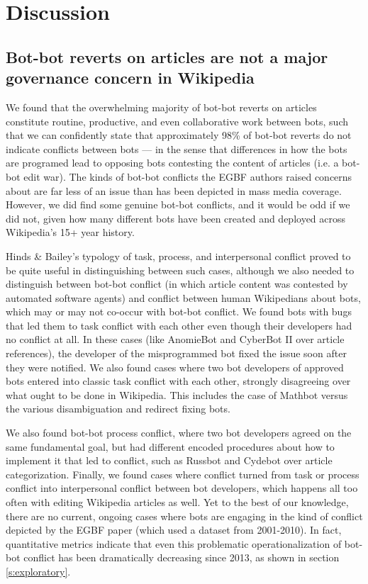 \documentclass[format=acmsmall, review=false, screen=true]{acmart}%
\begin{document}
\section{Discussion}

\subsection{Bot-bot reverts on articles are not a major governance concern in Wikipedia}  
We found that the overwhelming majority of bot-bot reverts on articles constitute routine, productive, and even collaborative work between bots, such that we can confidently state that approximately 98\% of bot-bot reverts do not indicate conflicts between bots --- in the sense that differences in how the bots are programed lead to opposing bots contesting the content of articles (i.e. a bot-bot edit war). The kinds of bot-bot conflicts the EGBF authors raised concerns about are far less of an issue than has been depicted in mass media coverage. However, we did find some genuine bot-bot conflicts, and it would be odd if we did not, given how many different bots have been created and deployed across Wikipedia's 15+ year history. 

Hinds \& Bailey's typology of task, process, and interpersonal conflict \cite{Hinds2003} proved to be quite useful in distinguishing between such cases, although we also needed to distinguish between bot-bot conflict (in which article content was contested by automated software agents) and conflict between human Wikipedians about bots, which may or may not co-occur with bot-bot conflict. We found bots with bugs that led them to task conflict with each other even though their developers had no conflict at all. In these cases (like AnomieBot and CyberBot II over article references), the developer of the misprogrammed bot fixed the issue soon after they were notified. We also found cases where two bot developers of approved bots entered into classic task conflict with each other, strongly disagreeing over what ought to be done in Wikipedia. This includes the case of Mathbot versus the various disambiguation and redirect fixing bots.

We also found bot-bot process conflict, where two bot developers agreed on the same fundamental goal, but had different encoded procedures about how to implement it that led to conflict, such as Russbot and Cydebot over article categorization. Finally, we found cases where conflict turned from task or process conflict into interpersonal conflict between bot developers, which happens all too often with editing Wikipedia articles as well. Yet to the best of our knowledge, there are no current, ongoing cases where bots are engaging in the kind of conflict depicted by the EGBF paper (which used a dataset from 2001-2010). In fact, quantitative metrics indicate that even this problematic operationalization of bot-bot conflict has been dramatically decreasing since 2013, as shown in section \ref{s:exploratory}. 
\end{document}
